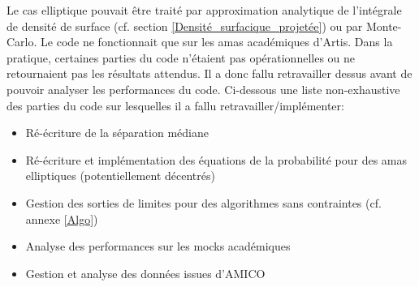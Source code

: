 \documentclass[a4paper,11pt]{article}
\numberwithin{equation}{section}
\begin{document}
		Le cas elliptique pouvait être traité par approximation analytique de l'intégrale de densité de surface (cf. section \ref{Densité_surfacique_projetée}) ou par Monte-Carlo. Le code ne fonctionnait que sur les amas académiques d'Artis.\newline
		Dans la pratique, certaines parties du code n'étaient pas opérationnelles ou ne retournaient pas les résultats attendus. Il a donc fallu retravailler dessus avant de pouvoir analyser les performances du code. Ci-dessous une liste non-exhaustive des parties du code sur lesquelles il a fallu retravailler/implémenter:
		\begin{itemize}
			\item Ré-écriture de la séparation médiane
			\item Ré-écriture et implémentation des équations de la probabilité pour des amas elliptiques (potentiellement décentrés)
			\item Gestion des sorties de limites pour des algorithmes sans contraintes (cf. annexe \ref{Algo})
			\item Analyse des performances sur les mocks académiques
			\item Gestion et analyse des données issues d'AMICO
		\end{itemize}
\end{document}
